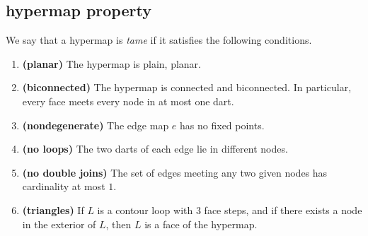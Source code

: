 




\subsection{hypermap property}
\label{sec:graphproperty}



We say that a hypermap is {\it tame\/} if it satisfies the following
conditions.
%

\begin{enumerate}
    \label{definition:tame}
    \item {\bf (planar)} The hypermap is plain, planar.
    \item {\bf (biconnected)} The hypermap is connected and biconnected.  In particular, every face meets every node in at most one dart.
    \item {\bf (nondegenerate)} The edge map $e$ has no fixed points.
    \item {\bf (no loops)} The two darts of each edge lie in different nodes.
    \item {\bf (no double joins)} The set of edges meeting any two given nodes has cardinality at most $1$.
    \label{definition:tame:40}

    \item {\bf (triangles)} If $L$ is a contour loop with $3$ face steps, and if there exists a node in
    the exterior of $L$, then $L$ is a face of the hypermap.
    \label{definition:tame:3-circuit}


\end{enumerate}
